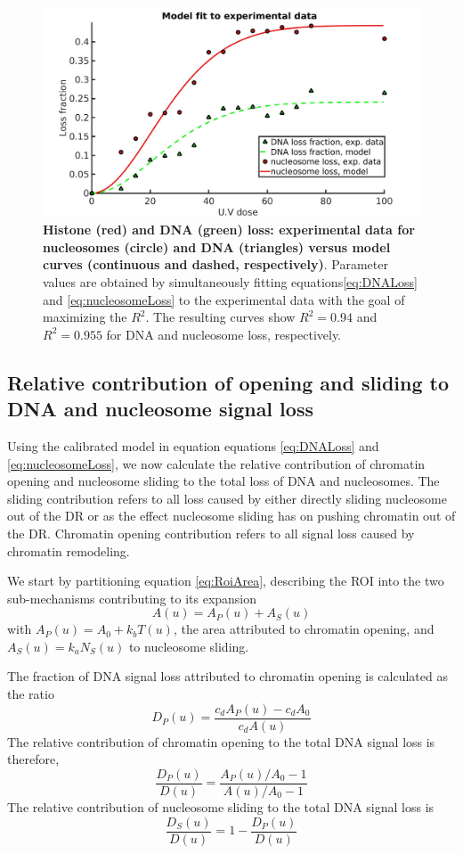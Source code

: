\documentclass[12pt]{article}
\begin{document}
	
\begin{figure}[H]
\centering
\includegraphics[width=0.5\linewidth, height=0.3\textheight]{histoneAndDnaVsUvDoseModelFit}
\caption{\textbf{Histone (red) and DNA (green) loss: experimental data
	for nucleosomes (circle) and DNA (triangles) versus model curves
	(continuous and dashed, respectively)}. Parameter values are obtained
	by simultaneously fitting equations\eqref{eq:DNALoss}  and \eqref{eq:nucleosomeLoss} to the experimental data with
	the goal of maximizing the $R^2$. The resulting curves show $R^2 = 0.94$ and
	$R^2 = 0.955$ for DNA and nucleosome loss, respectively.}
\label{fig:histoneAndDnaVsUvDoseModelFit}
\end{figure}

\subsection{Relative contribution of opening and sliding to DNA
	and nucleosome signal loss}

Using the calibrated model in equation equations \eqref{eq:DNALoss} and \eqref{eq:nucleosomeLoss}, we now calculate the
relative contribution of chromatin opening and nucleosome sliding to the
total loss of DNA and nucleosomes. The sliding contribution refers to all loss
caused by either directly sliding nucleosome out of the DR or as the effect
nucleosome sliding has on pushing chromatin out of the DR. Chromatin opening contribution refers to all signal loss caused by chromatin remodeling.

We start by partitioning equation \eqref{eq:RoiArea}, describing the ROI into the two sub-mechanisms contributing to its expansion 
\begin{equation*}
A(u) = A_P(u) +A_S(u)
\end{equation*}
with $A_P(u)=A_0+k_bT(u)$, the area attributed to chromatin opening, and $A_S(u)=k_aN_S(u)$ to nucleosome sliding. 

The fraction of DNA signal loss attributed to chromatin opening is calculated as the ratio 
\begin{equation*}
D_P(u)=\frac{c_dA_P(u)-c_dA_0}{c_dA(u)}
\end{equation*}
The relative contribution of chromatin opening to the total DNA signal loss is therefore,
\begin{equation}\label{eq:relativeOpeningSlidingDNA}
\frac{D_P(u)}{D(u)}=\frac{A_P(u)/A_0-1}{A(u)/A_0-1}
\end{equation}	
The relative contribution of nucleosome sliding to the total DNA signal loss is
\begin{equation}
\frac{D_S(u)}{D(u)}=1-\frac{D_P(u)}{D(u)}
\end{equation}
\end{document}
